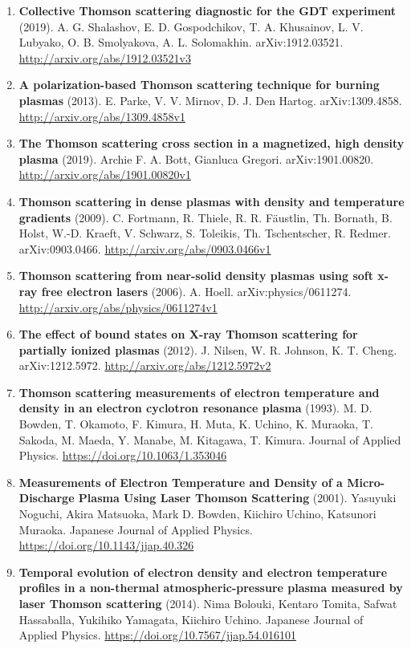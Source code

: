 \documentclass[11pt,a4paper]{article}
\begin{document}
\begin{enumerate}[leftmargin=1.4em]
\item \textbf{Collective Thomson scattering diagnostic for the GDT experiment} (2019). A. G. Shalashov, E. D. Gospodchikov, T. A. Khusainov, L. V. Lubyako, O. B. Smolyakova, A. L. Solomakhin. arXiv:1912.03521. \url{http://arxiv.org/abs/1912.03521v3}
\item \textbf{A polarization-based Thomson scattering technique for burning plasmas} (2013). E. Parke, V. V. Mirnov, D. J. Den Hartog. arXiv:1309.4858. \url{http://arxiv.org/abs/1309.4858v1}
\item \textbf{The Thomson scattering cross section in a magnetized, high density plasma} (2019). Archie F. A. Bott, Gianluca Gregori. arXiv:1901.00820. \url{http://arxiv.org/abs/1901.00820v1}
\item \textbf{Thomson scattering in dense plasmas with density and temperature gradients} (2009). C. Fortmann, R. Thiele, R. R. Fäustlin, Th. Bornath, B. Holst, W.-D. Kraeft, V. Schwarz, S. Toleikis, Th. Tschentscher, R. Redmer. arXiv:0903.0466. \url{http://arxiv.org/abs/0903.0466v1}
\item \textbf{Thomson scattering from near-solid density plasmas using soft x-ray free electron lasers} (2006). A. Hoell. arXiv:physics/0611274. \url{http://arxiv.org/abs/physics/0611274v1}
\item \textbf{The effect of bound states on X-ray Thomson scattering for partially ionized plasmas} (2012). J. Nilsen, W. R. Johnson, K. T. Cheng. arXiv:1212.5972. \url{http://arxiv.org/abs/1212.5972v2}
\item \textbf{Thomson scattering measurements of electron temperature and density in an electron cyclotron resonance plasma} (1993). M. D. Bowden, T. Okamoto, F. Kimura, H. Muta, K. Uchino, K. Muraoka, T. Sakoda, M. Maeda, Y. Manabe, M. Kitagawa, T. Kimura. Journal of Applied Physics. \url{https://doi.org/10.1063/1.353046}
\item \textbf{Measurements of Electron Temperature and Density of a Micro-Discharge Plasma Using Laser Thomson Scattering} (2001). Yasuyuki Noguchi, Akira Matsuoka, Mark D. Bowden, Kiichiro Uchino, Katsunori Muraoka. Japanese Journal of Applied Physics. \url{https://doi.org/10.1143/jjap.40.326}
\item \textbf{Temporal evolution of electron density and electron temperature profiles in a non-thermal atmospheric-pressure plasma measured by laser Thomson scattering} (2014). Nima Bolouki, Kentaro Tomita, Safwat Hassaballa, Yukihiko Yamagata, Kiichiro Uchino. Japanese Journal of Applied Physics. \url{https://doi.org/10.7567/jjap.54.016101}

\end{enumerate}
\end{document}
